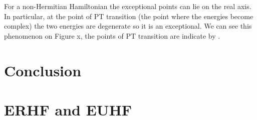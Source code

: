 \documentclass[11pt,a4paper]{article}
\begin{document}
For a non-Hermitian Hamiltonian the exceptional points can lie on the real axis. In particular, at the point of PT transition (the point where the energies become complex) the two energies are degenerate so it is an exceptional. We can see this phenomenon on Figure x, the points of PT transition are indicate by .

\section{Conclusion}

\newpage

\printbibliography

\newpage
\appendix

\section{ERHF and EUHF}
\end{document}
